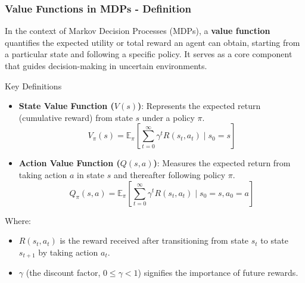 \documentclass[aspectratio=169]{beamer}
\begin{document}
\begin{frame}[fragile]
    \frametitle{Value Functions in MDPs - Definition}

    In the context of Markov Decision Processes (MDPs), a \textbf{value function} quantifies the expected utility or total reward an agent can obtain, starting from a particular state and following a specific policy. It serves as a core component that guides decision-making in uncertain environments.

    \begin{block}{Key Definitions}
        \begin{itemize}
            \item \textbf{State Value Function ($V(s)$)}: Represents the expected return (cumulative reward) from state $s$ under a policy $\pi$.
            \begin{equation}
                V_{\pi}(s) = \mathbb{E}_{\pi}\left[ \sum_{t=0}^{\infty} \gamma^t R(s_t, a_t) \mid s_0 = s \right]
            \end{equation}
            
            \item \textbf{Action Value Function ($Q(s, a)$)}: Measures the expected return from taking action $a$ in state $s$ and thereafter following policy $\pi$.
            \begin{equation}
                Q_{\pi}(s, a) = \mathbb{E}_{\pi}\left[ \sum_{t=0}^{\infty} \gamma^t R(s_t, a_t) \mid s_0 = s, a_0 = a\right]
            \end{equation}
        \end{itemize}
    \end{block}
    
    Where:
    \begin{itemize}
        \item $R(s_t, a_t)$ is the reward received after transitioning from state $s_t$ to state $s_{t+1}$ by taking action $a_t$.
        \item $\gamma$ (the discount factor, $0 \leq \gamma < 1$) signifies the importance of future rewards.
    \end{itemize}
\end{frame}
\end{document}
